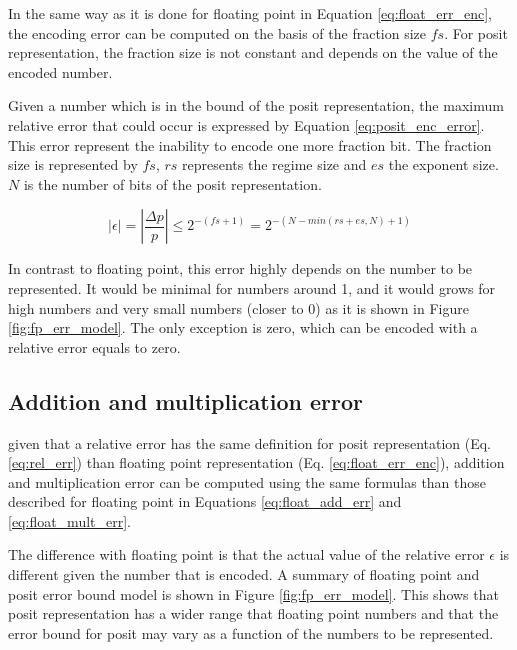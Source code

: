 In the same way as it is done for floating point in Equation \ref{eq:float_err_enc}, the encoding error can be computed on the basis of the fraction size $fs$. For posit representation, the fraction size is not constant and depends on the value of the encoded number.

Given a number which is in the bound of the posit representation, the maximum relative error that could occur is expressed by Equation \ref{eq:posit_enc_error}. This error represent the inability to encode one more fraction bit. The fraction size is represented by $fs$, $rs$ represents the regime size and $es$ the exponent size. $N$ is the number of bits of the posit representation.

\begin{equation}
	|\epsilon| = \left |\frac{\Delta p}{p} \right| \leq 2^{-(fs+1)} = 2^{-(N-min(rs+es, N)+1)}
	\label{eq:posit_enc_error}
\end{equation}


In contrast to floating point, this error highly depends on the number to be represented. It would be minimal for numbers around 1, and it would grows for high numbers and very small numbers (closer to 0) as it is shown in Figure \ref{fig:fp_err_model}. The only exception is zero, which can be encoded with a relative error equals to zero.

\subsection{Addition and multiplication error}

given that a relative error has the same definition for posit representation (Eq. \ref{eq:rel_err}) than floating point representation (Eq. \ref{eq:float_err_enc}), addition and multiplication error can be computed using the same formulas than those described for floating point in Equations \ref{eq:float_add_err} and \ref{eq:float_mult_err}.

The difference with floating point is that the actual value of the relative error $\epsilon$ is different given the number that is encoded. A summary of floating point and posit error bound model is shown in Figure \ref{fig:fp_err_model}. This shows that posit representation has a wider range that floating point numbers and that the error bound for posit may vary as a function of the numbers to be represented.

